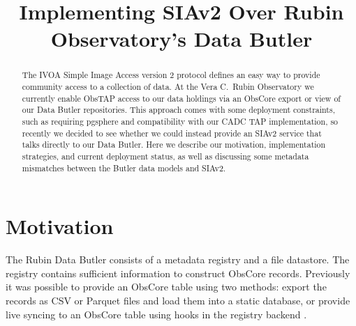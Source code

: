 \documentclass[11pt,twoside]{article}
\begin{document}
\title{Implementing SIAv2 Over Rubin Observatory's Data Butler}




\begin{abstract}
The IVOA Simple Image Access version 2 protocol defines an easy way to provide community access to a collection of data.
At the Vera C.\ Rubin Observatory we currently enable ObsTAP access to our data holdings via an ObsCore export or view of our Data Butler repositories.
This approach comes with some deployment constraints, such as requiring pgsphere and compatibility with our CADC TAP implementation, so recently we decided to see whether we could instead provide an SIAv2 service that talks directly to our Data Butler.
Here we describe our motivation, implementation strategies, and current deployment status, as well as discussing some metadata mismatches between the Butler data models and SIAv2.
\end{abstract}



\section{Motivation}

The Rubin Data Butler \citep{2022SPIE12189E..11J} consists of a metadata registry and a file datastore.
The registry contains sufficient information to construct ObsCore records.
Previously it was possible to provide an ObsCore table using two methods: export the records as CSV or Parquet files and load them into a static database, or provide live syncing to an ObsCore table using hooks in the registry backend \citep{DMTN-236}.
\end{document}
